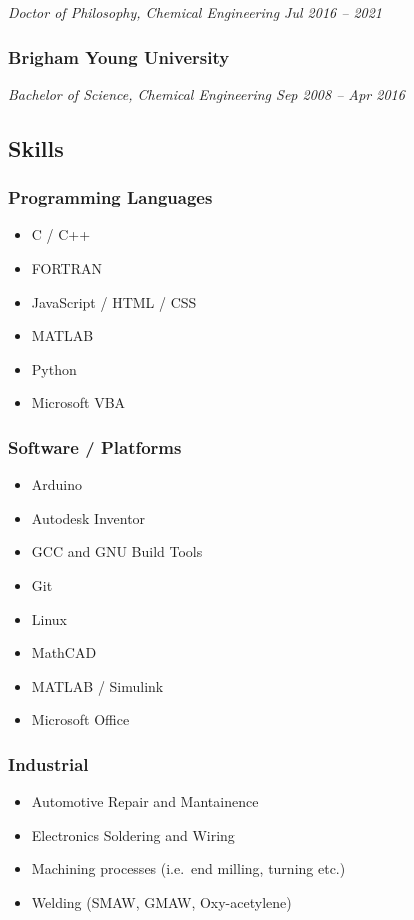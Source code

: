 \emph{Doctor of Philosophy, Chemical Engineering \textbar{} Jul 2016 --
2021}

\hypertarget{brigham-young-university-1}{%
\subsubsection{Brigham Young
University}\label{brigham-young-university-1}}

\emph{Bachelor of Science, Chemical Engineering \textbar{} Sep 2008 --
Apr 2016}

\hypertarget{skills}{%
\subsection{Skills}\label{skills}}

\hypertarget{programming-languages}{%
\subsubsection{Programming Languages}\label{programming-languages}}

\begin{itemize}
\tightlist
\item
  C / C++
\item
  FORTRAN
\item
  JavaScript / HTML / CSS
\item
  MATLAB
\item
  Python
\item
  Microsoft VBA
\end{itemize}

\hypertarget{software-platforms}{%
\subsubsection{Software / Platforms}\label{software-platforms}}

\begin{itemize}
\tightlist
\item
  Arduino
\item
  Autodesk Inventor
\item
  GCC and GNU Build Tools
\item
  Git
\item
  Linux
\item
  MathCAD
\item
  MATLAB / Simulink
\item
  Microsoft Office
\end{itemize}

\hypertarget{industrial}{%
\subsubsection{Industrial}\label{industrial}}

\begin{itemize}
\tightlist
\item
  Automotive Repair and Mantainence
\item
  Electronics Soldering and Wiring
\item
  Machining processes (i.e.~end milling, turning etc.)
\item
  Welding (SMAW, GMAW, Oxy-acetylene)
\end{itemize}
